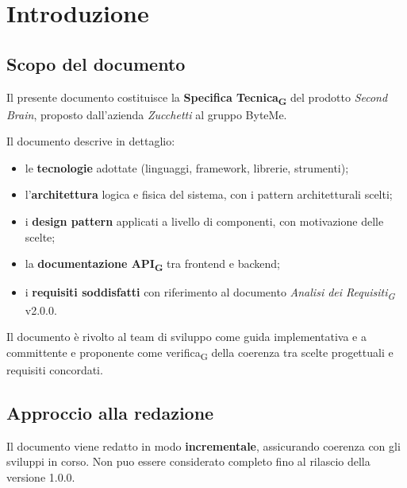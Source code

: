 \documentclass[11pt,a4paper]{article}
\newcommand{\gls}[1]{#1\textsubscript{G}}
\begin{document}
\tableofcontents
\thispagestyle{empty}
\newpage

\setcounter{page}{1}

\section{Introduzione}
\subsection{Scopo del documento}
Il presente documento costituisce la \textbf{\gls{Specifica Tecnica}} del prodotto
\textit{Second Brain}, proposto dall'azienda \textit{Zucchetti} al
gruppo ByteMe.
 
Il documento descrive in dettaglio:
\begin{itemize}
  \item le \textbf{tecnologie} adottate (linguaggi, framework, librerie, strumenti);
  \item l'\textbf{architettura} logica e fisica del sistema, con i pattern architetturali scelti;
  \item i \textbf{design pattern} applicati a livello di componenti, con motivazione delle scelte;
  \item la \textbf{documentazione \gls{API}} tra frontend e backend;
  \item i \textbf{requisiti soddisfatti} con riferimento al documento \textit{\gls{Analisi dei Requisiti}} v2.0.0.
\end{itemize}
 
Il documento è rivolto al team di sviluppo come guida implementativa e a
committente e proponente come \gls{verifica} della coerenza tra scelte progettuali e requisiti concordati.
 
\subsection{Approccio alla redazione}
Il documento viene redatto in modo \textbf{incrementale}, assicurando coerenza con gli sviluppi in corso. Non puo essere considerato completo fino al rilascio della versione 1.0.0.
\end{document}

